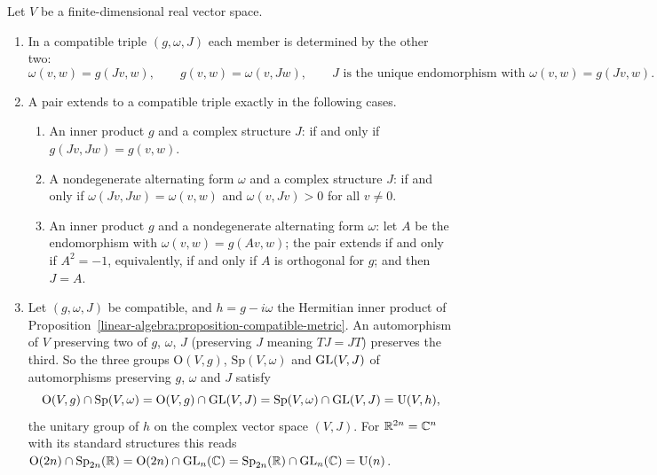 \begin{proposition}\label{linear-algebra:proposition-two-of-three}
Let $V$ be a finite-dimensional real vector space.
\begin{enumerate}
\item In a compatible triple $(g, \omega, J)$ each member is determined by the other two:
\[
\omega(v, w) = g(Jv, w), \qquad g(v, w) = \omega(v, Jw), \qquad J \text{ is the unique endomorphism with } \omega(v, w) = g(Jv, w).
\]
\item A pair extends to a compatible triple exactly in the following cases.
\begin{enumerate}
\item An inner product $g$ and a complex structure $J$: if and only if $g(Jv, Jw) = g(v, w)$.
\item A nondegenerate alternating form $\omega$ and a complex structure $J$: if and only if $\omega(Jv, Jw) = \omega(v, w)$ and $\omega(v, Jv) > 0$ for all $v \neq 0$.
\item An inner product $g$ and a nondegenerate alternating form $\omega$: let $A$ be the endomorphism with $\omega(v, w) = g(Av, w)$; the pair extends if and only if $A^2 = -1$, equivalently, if and only if
$A$ is orthogonal for $g$; and then $J = A$.
\end{enumerate}
\item Let $(g, \omega, J)$ be compatible, and $h = g - i\omega$ the Hermitian inner product of Proposition~\ref{linear-algebra:proposition-compatible-metric}. An automorphism of $V$ preserving two of
$g$, $\omega$, $J$ (preserving $J$ meaning $TJ = JT$) preserves the third. So the three groups $\mathrm{O}(V, g)$, $\mathrm{Sp}(V, \omega)$ and $\mathrm{GL}(V, J)$ of automorphisms preserving $g$, $\omega$ and $J$
satisfy
\[
\mathrm{O}(V, g) \cap \mathrm{Sp}(V, \omega) = \mathrm{O}(V, g) \cap \mathrm{GL}(V, J) = \mathrm{Sp}(V, \omega) \cap \mathrm{GL}(V, J) = \mathrm{U}(V, h),
\]
the unitary group of $h$ on the complex vector space $(V, J)$. For $\mathbb{R}^{2n} = \mathbb{C}^n$ with its standard structures this reads $\mathrm{O}(2n) \cap \mathrm{Sp}_{2n}(\mathbb{R}) = \mathrm{O}(2n) \cap \mathrm{GL}_n(\mathbb{C}) =
\mathrm{Sp}_{2n}(\mathbb{R}) \cap \mathrm{GL}_n(\mathbb{C}) = \mathrm{U}(n)$.
\end{enumerate}
\end{proposition}

